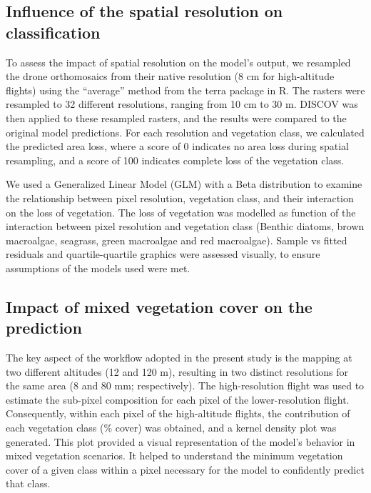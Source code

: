 \documentclass[
  number]{elsarticle}
\begin{document}
\subsection{Influence of the spatial resolution on
classification}\label{influence-of-the-spatial-resolution-on-classification}

To assess the impact of spatial resolution on the model's output, we
resampled the drone orthomosaics from their native resolution (8 cm for
high-altitude flights) using the ``average'' method from the terra
package in R. The rasters were resampled to 32 different resolutions,
ranging from 10 cm to 30 m. DISCOV was then applied to these resampled
rasters, and the results were compared to the original model
predictions. For each resolution and vegetation class, we calculated the
predicted area loss, where a score of 0 indicates no area loss during
spatial resampling, and a score of 100 indicates complete loss of the
vegetation class.

We used a Generalized Linear Model (GLM) with a Beta distribution to
examine the relationship between pixel resolution, vegetation class, and
their interaction on the loss of vegetation. The loss of vegetation was
modelled as function of the interaction between pixel resolution and
vegetation class (Benthic diatoms, brown macroalgae, seagrass, green
macroalgae and red macroalgae). Sample vs fitted residuals and
quartile-quartile graphics were assessed visually, to ensure assumptions
of the models used were met.

\subsection{Impact of mixed vegetation cover on the
prediction}\label{impact-of-mixed-vegetation-cover-on-the-prediction}

The key aspect of the workflow adopted in the present study is the
mapping at two different altitudes (12 and 120 m), resulting in two
distinct resolutions for the same area (8 and 80 mm; respectively). The
high-resolution flight was used to estimate the sub-pixel composition
for each pixel of the lower-resolution flight. Consequently, within each
pixel of the high-altitude flights, the contribution of each vegetation
class (\% cover) was obtained, and a kernel density plot was generated.
This plot provided a visual representation of the model's behavior in
mixed vegetation scenarios. It helped to understand the minimum
vegetation cover of a given class within a pixel necessary for the model
to confidently predict that class.
\end{document}
